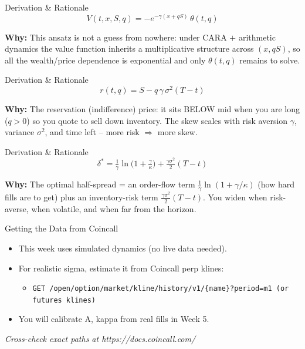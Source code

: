 \documentclass[aspectratio=169,10pt]{beamer}
\begin{document}
\begin{frame}{Derivation \& Rationale}
\[V(t,x,S,q) = -e^{-\gamma(x+qS)}\,\theta(t,q)\]

\small\textbf{\color{ncsured}Why:} This ansatz is not a guess from nowhere: under CARA $+$ arithmetic dynamics the value function inherits a multiplicative structure across $(x, qS)$, so all the wealth/price dependence is exponential and only $\theta(t,q)$ remains to solve.
\end{frame}

\begin{frame}{Derivation \& Rationale}
\[r(t,q) = S - q\,\gamma\,\sigma^2 (T-t)\]

\small\textbf{\color{ncsured}Why:} The reservation (indifference) price: it sits BELOW mid when you are long ($q>0$) so you quote to sell down inventory. The skew scales with risk aversion $\gamma$, variance $\sigma^2$, and time left -- more risk $\Rightarrow$ more skew.
\end{frame}

\begin{frame}{Derivation \& Rationale}
\[\delta^* = \tfrac{1}{\gamma}\ln\!\big(1+\tfrac{\gamma}{\kappa}\big) + \tfrac{\gamma\sigma^2}{2}(T-t)\]

\small\textbf{\color{ncsured}Why:} The optimal half-spread = an order-flow term $\tfrac1\gamma\ln(1+\gamma/\kappa)$ (how hard fills are to get) plus an inventory-risk term $\tfrac{\gamma\sigma^2}{2}(T-t)$. You widen when risk-averse, when volatile, and when far from the horizon.
\end{frame}

\begin{frame}{Getting the Data from Coincall}
\begin{itemize}
  \item This week uses simulated dynamics (no live data needed).
  \item For realistic sigma, estimate it from Coincall perp klines:
  \begin{itemize}\item \texttt{\small GET /open/option/market/kline/history/v1/\{name\}?period=m1  (or futures klines)}\end{itemize}
  \item You will calibrate A, kappa from real fills in Week 5.
\end{itemize}
\vspace{2pt}\tiny\textit{Cross-check exact paths at https://docs.coincall.com/}
\end{frame}
\end{document}
